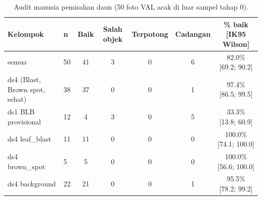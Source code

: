 \begin{table}[!t]
\centering
\caption{Audit manusia pemisahan daun (50 foto VAL acak di luar sampel tahap 0).}
\label{tab:v9_audit}
\footnotesize
\setlength{\tabcolsep}{3pt}
\begin{tabular}{llccccc}
\hline
\textbf{Kelompok} & \textbf{n} & \textbf{Baik} & \textbf{Salah objek} & \textbf{Terpotong} & \textbf{Cadangan} & \textbf{\% baik [IK95 Wilson]} \\
\hline
semua & 50 & 41 & 3 & 0 & 6 & 82.0\% [69.2; 90.2] \\
ds4 (Blast, Brown spot, sehat) & 38 & 37 & 0 & 0 & 1 & 97.4\% [86.5; 99.5] \\
ds1 BLB provisional & 12 & 4 & 3 & 0 & 5 & 33.3\% [13.8; 60.9] \\
ds4 leaf\_blast & 11 & 11 & 0 & 0 & 0 & 100.0\% [74.1; 100.0] \\
ds4 brown\_spot & 5 & 5 & 0 & 0 & 0 & 100.0\% [56.6; 100.0] \\
ds4 background & 22 & 21 & 0 & 0 & 1 & 95.5\% [78.2; 99.2] \\
\hline
\end{tabular}
\end{table}
